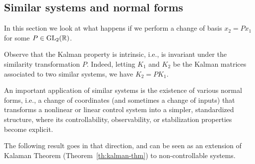 \subsection{Similar systems and normal forms}

In this section we look at what happens if we perform a change of basis $x_2 = Px_1$ for some $P\in \operatorname{GL}_2(\mathbb{R})$.


Observe that the Kalman property is intrinsic, i.e., is invariant under the similarity transformation $P$.
Indeed, letting $K_1$ and $K_2$ be the Kalman matrices associated to two similar systems, we have $K_2=PK_1$.

An important application of similar systems is the existence of various normal forms, i.e., a change of coordinates (and sometimes a change of inputs) that transforms a nonlinear or linear control system into a simpler, standardized structure, where its controllability, observability, or stabilization properties become explicit.

The following result goes in that direction, and can be seen as an extension of Kalaman Theorem (Theorem~\ref{th:kalman-thm}) to non-controllable systems.


